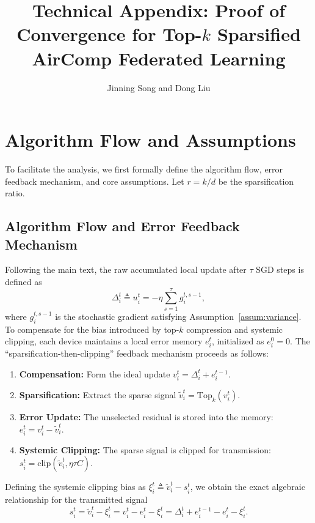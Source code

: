 \documentclass[conference]{IEEEtran}
\begin{document}
\title{Technical Appendix: Proof of Convergence for Top-$k$ Sparsified AirComp Federated Learning}
\author{Jinning Song and Dong Liu}
\maketitle

\section{Algorithm Flow and Assumptions}

To facilitate the analysis, we first formally define the algorithm flow, error feedback mechanism, and core assumptions.
Let $r = k/d$ be the sparsification ratio.

\subsection{Algorithm Flow and Error Feedback Mechanism}
Following the main text, the raw accumulated local update after $\tau$ SGD steps is defined as
\begin{equation}
    \Delta_i^t \triangleq u_i^t = -\eta \sum_{s=1}^{\tau} g_i^{t,s-1},
\end{equation}
where $g_i^{t,s-1}$ is the stochastic gradient satisfying Assumption~\ref{assum:variance}.
To compensate for the bias introduced by top-$k$ compression and systemic clipping, each device maintains a local error memory $e_i^t$, initialized as $e_i^0 = 0$.
The ``sparsification-then-clipping'' feedback mechanism proceeds as follows:
\begin{enumerate}
    \item \textbf{Compensation:} Form the ideal update $v_i^t = \Delta_i^t + e_i^{t-1}$.
    \item \textbf{Sparsification:} Extract the sparse signal $\tilde{v}_i^t = \mathrm{Top}_k(v_i^t)$.
    \item \textbf{Error Update:} The unselected residual is stored into the memory: $e_i^t = v_i^t - \tilde{v}_i^t$.
    \item \textbf{Systemic Clipping:} The sparse signal is clipped for transmission: $s_i^t = \mathrm{clip}(\tilde{v}_i^t, \eta\tau C)$.
\end{enumerate}
Defining the systemic clipping bias as $\xi_i^t \triangleq \tilde{v}_i^t - s_i^t$, we obtain the exact algebraic relationship for the transmitted signal
\begin{equation} \label{eqn:transmit_signal}
    s_i^t = \tilde{v}_i^t - \xi_i^t = v_i^t - e_i^t - \xi_i^t = \Delta_i^t + e_i^{t-1} - e_i^t - \xi_i^t.
\end{equation}
\end{document}
